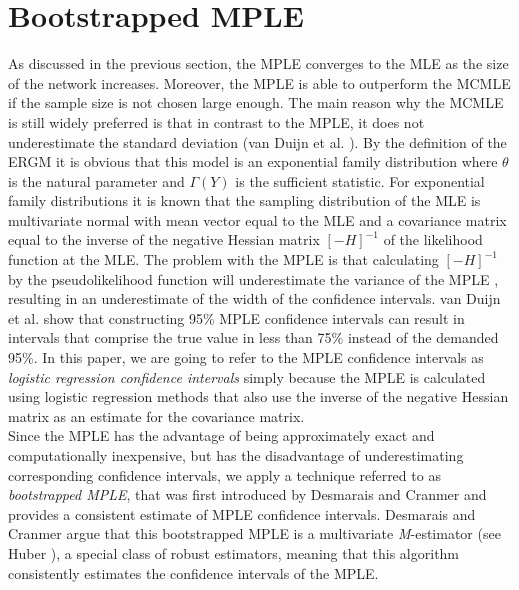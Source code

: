 \documentclass[10pt, conference, compsocconf]{IEEEtran}
\begin{document}
\section{Bootstrapped MPLE}
\noindent As discussed in the previous section, the MPLE converges to the MLE as the size of the network increases. Moreover, the MPLE is able to outperform the MCMLE if the sample size is not chosen large enough. The main reason why the MCMLE is still widely preferred is that in contrast to the MPLE, it does not underestimate the standard deviation (van Duijn et al. \cite{vanDuijnetal2009}). By the definition of the ERGM it is obvious that this model is an exponential family distribution where $\theta$ is the natural parameter and $\Gamma (Y)$ is the sufficient statistic. For exponential family distributions it is known that the sampling distribution of the MLE is multivariate normal with mean vector equal to the MLE and a covariance matrix equal to the inverse of the negative Hessian matrix $[-H]^{-1}$ of the likelihood function at the MLE. The problem with the MPLE is that calculating $[-H]^{-1}$ by the pseudolikelihood function will underestimate the variance of the MPLE \cite{vanDuijnetal2009}, resulting in an underestimate of the width of the confidence intervals. van Duijn et al. show that constructing 95\% MPLE confidence intervals can result in intervals that comprise the true value in less than 75\% instead of the demanded 95\%. In this paper, we are going to refer to the MPLE confidence intervals as \textit{logistic regression confidence intervals} simply because the MPLE is calculated using logistic regression methods that also use the inverse of the negative Hessian matrix as an estimate for the covariance matrix. \\[0.3cm]
\noindent Since the MPLE has the advantage of being approximately exact and computationally inexpensive, but has the disadvantage of underestimating corresponding confidence intervals, we apply a technique referred to as \textit{bootstrapped MPLE}, that was first introduced by Desmarais and Cranmer \cite{Desmarais.2012} and provides a consistent estimate of MPLE confidence intervals. Desmarais and Cranmer argue that this bootstrapped MPLE is a multivariate \textit{M}-estimator (see Huber \cite{Huber1981}), a special class of robust estimators, meaning that this algorithm consistently estimates the confidence intervals of the MPLE. \\[0.3cm]
\end{document}
